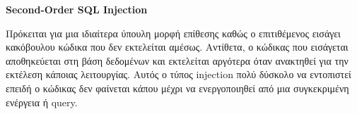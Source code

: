 \begin{center}
    \textbf{\lt Second-Order SQL Injection}
\end{center}

Πρόκειται για μια ιδιαίτερα ύπουλη μορφή επίθεσης καθώς ο επιτιθέμενος εισάγει κακόβουλου κώδικα που δεν εκτελείται αμέσως. Αντίθετα, ο κώδικας που εισάγεται αποθηκεύεται στη βάση δεδομένων και εκτελείται αργότερα όταν ανακτηθεί για την εκτέλεση κάποιας λειτουργίας. Αυτός ο τύπος \lt injection  πολύ δύσκολο να εντοπιστεί επειδή ο κώδικας δεν φαίνεται κάπου μέχρι να ενεργοποιηθεί από μια συγκεκριμένη ενέργεια ή \lt query\gt.
